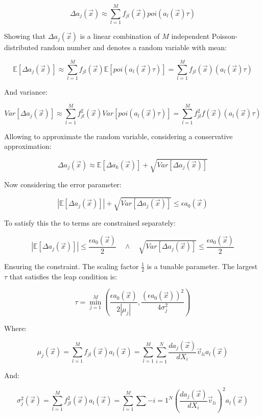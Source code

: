       $$\Delta a_j(\vec{x}) \approx\sum\limits_{l=1}^Mf_{jl}(\vec{x})poi(a_l(\vec{x})\tau)$$

      Showing that $\Delta a_j(\vec{x})$ is a linear combination of $M$ independent Poisson-distributed random number and denotes a random variable with mean:

      $$\mathbb{E}[\Delta a_j(\vec{x})] \approx\sum\limits_{l=1}^Mf_{jl}(\vec{x})\mathbb{E}[poi(a_l(\vec{x})\tau)] = \sum\limits_{l=1}^Mf_{jl}(\vec{x})(a_l(\vec{x})\tau)$$

      And variance:

      $$Var[\Delta a_j(\vec{x})]\approx\sum\limits_{l=1}^Mf_{jl}^2(\vec{x})Var[poi(a_l(\vec{x})\tau)] = \sum\limits_{l=1}^Mf_{jl}^2f(\vec{x})(a_l(\vec{x})\tau)$$

      Allowing to approximate the random variable, considering a conservative approximation:

      $$\Delta a_j(\vec{x})\approx\mathbb{E}[\Delta a_k(\vec{x})] + \sqrt{Var[\Delta a_j(\vec{x})]}$$

      Now considering the error parameter:

      $$|\mathbb{E}[\Delta a_j(\vec{x})]| + \sqrt{Var[\Delta a_j(\vec{x})]}\le \epsilon a_0(\vec{x})$$

      To satisfy this the to terms are constrained separately:

      $$|\mathbb{E}[\Delta a_j(\vec{x})]|\le \frac{\epsilon a_0(\vec{x})}{2}\quad\land\quad\sqrt{Var[\Delta a_j(\vec{x})]}\le \frac{\epsilon a_0(\vec{x})}{2}$$

      Ensuring the constraint.
      The scaling factor $\frac{1}{2}$ is a tunable parameter.
      The largest $\tau$ that satisfies the leap condition is:

      $$\tau = \min\limits_{j=1}^M\left(\frac{\epsilon a_0(\vec{x})}{2|\mu_j|}, \frac{(\epsilon a_0(\vec{x}))^2}{4\sigma^2_j}\right)$$

      Where:

      $$\mu_j(\vec{x}) = \sum\limits_{l=1}^Mf_{jl}(\vec{x})a_l(\vec{x}) = \sum\limits_{l=1}^M\sum\limits_{i=1}^N\frac{da_j(\vec{x})}{dX_i}\vec{v}_{li}a_l(\vec{x})$$

      And:

      $$\sigma^2_j(\vec{x}) = \sum\limits_{l=1}^Mf_{jl}^2(\vec{x})a_l(\vec{x}) = \sum\limits_{l=1}^M\sum\limits-{i=1}^N\left(\frac{da_j(\vec{x})}{dX_i}\vec{v}_{li}\right)^2a_l(\vec{x})$$

